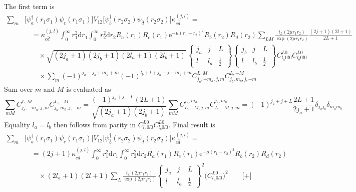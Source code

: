 \documentclass[10pt,a4paper]{article}
\begin{document}
The first term is
\begin{align}
\sum_m &\big[\psi_a^\dagger(r_1\sigma_1)\psi_c(r_1\sigma_1)\big]V_{12}
\big[\psi_{\bar{b}}^\dagger(r_2\sigma_2)\psi_{\bar{d}}(r_2\sigma_2)\big]
\kappa_{c\bar{d}}^{(j,l)} = \nonumber\\
&\quad =\kappa_{c\bar{d}}^{(j,l)} \int_0^\infty r_1^2\mathrm{d}r_1
\int_0^\infty r_2^2\mathrm{d}r_2 R_a(r_1) R_c(r_1) \mathrm{e}^{-\mu(r_1-r_2)^2}
R_b(r_2) R_d(r_2) \sum_{LM}\frac{i_L(2\mu r_1 r_2)}{\exp(2\mu r_1 r_2)}
\frac{(2j+1)(2l+1)}{2L+1} \nonumber\\
&\qquad\times\sqrt{(2j_a+1)(2j_b+1)(2l_a+1)(2l_b+1)}\,
\begin{Bmatrix} j_a & j & L \\ l & l_a & \frac{1}{2} \end{Bmatrix}
\begin{Bmatrix} j_b & j & L \\ l & l_b & \frac{1}{2} \end{Bmatrix}
C_{l_a 0 l 0}^{L0} C_{l_b 0 l 0}^{L0} \nonumber\\
&\qquad\times\sum_m (-1)^{j_a-j_b+m_a+m}(-1)^{l_b+l+j_b+j+m_b+m}
C_{j_a,-m_a,j,m}^{L,M} C_{j_b,m_b,j,-m}^{L,-M}
\end{align}
Sum over $m$ and $M$ is evaluated as
\begin{equation}
\sum_{mM} C_{j_a,-m_a,j,m}^{L,M} C_{j_b,m_b,j,-m}^{L,-M} =
\frac{(-1)^{j_b+j-L} (2L+1)}{\sqrt{(2j_a+1)(2j_b+1)}} \sum_{mM}
C_{L,-M,j,m}^{j_a,m_a} C_{L,-M,j,m}^{j_b,m_b} =
(-1)^{j_a+j+L} \frac{2L+1}{2j_a+1} \delta_{j_a j_b} \delta_{m_a m_b}
\end{equation}
Equality $l_a=l_b$ then follows from parity in $C_{l_a 0 l 0}^{L0} C_{l_b 0 l 0}^{L0}$. Final result is
\begin{align}
\sum_m &\big[\psi_a^\dagger(r_1\sigma_1)\psi_c(r_1\sigma_1)\big]V_{12}
\big[\psi_{\bar{b}}^\dagger(r_2\sigma_2)\psi_{\bar{d}}(r_2\sigma_2)\big]
\kappa_{c\bar{d}}^{(j,l)} = \nonumber\\
&\quad =(2j+1)\kappa_{c\bar{d}}^{(j,l)} \int_0^\infty r_1^2\mathrm{d}r_1
\int_0^\infty r_2^2\mathrm{d}r_2 R_a(r_1) R_c(r_1) \mathrm{e}^{-\mu(r_1-r_2)^2}
R_b(r_2) R_d(r_2) \nonumber\\
&\qquad\times(2l_a+1)(2l+1) \sum_L\frac{i_L(2\mu r_1 r_2)}{\exp(2\mu r_1 r_2)}
\begin{Bmatrix} j_a & j & L \\ l & l_a & \frac{1}{2} \end{Bmatrix}^2
\Big(C_{l_a 0 l 0}^{L0}\Big)^2 \qquad \textbf{[+]}
\end{align}
\end{document}
